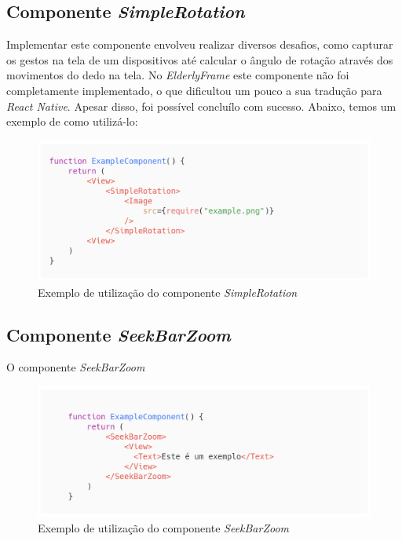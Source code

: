 \documentclass[
	12pt,				    %
	openright,			    %
	oneside,			    %
	a4paper,			    %
    sumario=tradicional,    %
	english,			    %
	brazil,				    %
	]{abntex2}              %
\begin{document}
\subsection{Componente \textit{SimpleRotation}}

Implementar este componente envolveu realizar diversos desafios, como capturar os gestos na tela de um dispositivos até calcular o ângulo de rotação através dos movimentos do dedo na tela. No \textit{ElderlyFrame} este componente não foi completamente implementado, o que dificultou um pouco a sua tradução para \textit{React Native}. Apesar disso, foi possível concluílo com sucesso. Abaixo, temos um exemplo de como utilizá-lo:

\begin{figure}[H]
	\begin{center}
		\includegraphics[width=.8\linewidth]{images/SimpleRotation.png}
		\caption[Componente \textit{SimpleRotation}]{Exemplo de utilização do componente \textit{SimpleRotation}}
		\label{fig:simpleRotationExample}
	\end{center}
\end{figure}

\subsection{Componente \textit{SeekBarZoom}}

O componente \textit{SeekBarZoom}

\begin{figure}[H]
	\begin{center}
		\includegraphics[width=.8\linewidth]{images/SeekBarZoom.png}
		\caption[Componente \textit{SeekBarZoom}]{Exemplo de utilização do componente \textit{SeekBarZoom}}
		\label{fig:seekBarZoomExample}
	\end{center}
\end{figure}
\end{document}
